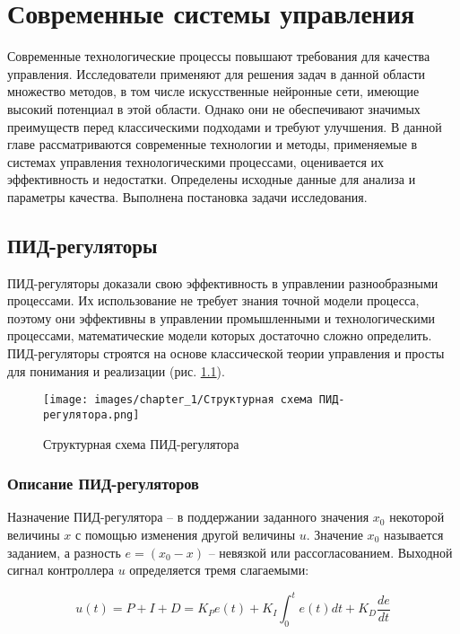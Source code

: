 \chapter{Современные системы управления}

Современные технологические процессы повышают требования для качества управления. Исследователи применяют для решения задач в данной области множество методов, в том числе искусственные нейронные сети, имеющие высокий потенциал в этой области. Однако они не обеспечивают значимых преимуществ перед классическими подходами и требуют улучшения.
В данной главе рассматриваются современные технологии и методы, применяемые в системах управления технологическими процессами, оценивается их эффективность и недостатки. Определены исходные данные для анализа и параметры качества. Выполнена постановка задачи исследования.

\section{ПИД-регуляторы}

ПИД-регуляторы доказали свою эффективность в управлении разнообразными процессами. Их использование не требует знания точной модели процесса, поэтому они эффективны в управлении промышленными и технологическими процессами, математические модели которых достаточно сложно определить. ПИД-регуляторы строятся на основе классической теории управления и просты для понимания и реализации (рис. \ref{fig:PID_controller_scheme}).

\begin{figure}[H]
    \centering
    \texttt{[image: images/chapter\_1/Структурная схема ПИД-регулятора.png]}
    \caption{Структурная схема ПИД-регулятора}
    \label{fig:PID_controller_scheme}
\end{figure}

\subsection{Описание ПИД-регуляторов}

Назначение ПИД-регулятора – в поддержании заданного значения $x_0$ некоторой величины $x$ с помощью изменения другой величины $u$. Значение $x_0$ называется заданием, а разность $e = (x_0 - x)$ – невязкой или рассогласованием. Выходной сигнал контроллера $u$ определяется тремя слагаемыми:

\begin{equation}
    \label{eq_PID}
    u(t) = P + I + D = K_P e(t) + K_I \int_{0}^{t} e(t) dt + K_D \frac{de}{dt}
\end{equation}

